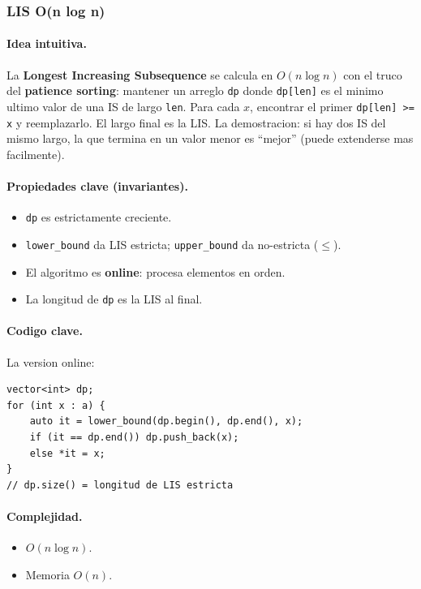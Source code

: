 ﻿\subsubsection{LIS O(n log n)}

\paragraph{Idea intuitiva.}
La \textbf{Longest Increasing Subsequence} se calcula en $O(n \log n)$ con el truco del \textbf{patience sorting}: mantener un arreglo \texttt{dp} donde \texttt{dp[len]} es el minimo ultimo valor de una IS de largo \texttt{len}. Para cada $x$, encontrar el primer \texttt{dp[len] >= x} y reemplazarlo. El largo final es la LIS. La demostracion: si hay dos IS del mismo largo, la que termina en un valor menor es ``mejor'' (puede extenderse mas facilmente).

\paragraph{Propiedades clave (invariantes).}
\begin{itemize}\setlength\itemsep{0pt}
	\item \texttt{dp} es estrictamente creciente.
	\item \texttt{lower\_bound} da LIS estricta; \texttt{upper\_bound} da no-estricta ($\le$).
	\item El algoritmo es \textbf{online}: procesa elementos en orden.
	\item La longitud de \texttt{dp} es la LIS al final.
\end{itemize}

\paragraph{Codigo clave.}
La version online:
\begin{verbatim}
vector<int> dp;
for (int x : a) {
    auto it = lower_bound(dp.begin(), dp.end(), x);
    if (it == dp.end()) dp.push_back(x);
    else *it = x;
}
// dp.size() = longitud de LIS estricta
\end{verbatim}

\paragraph{Complejidad.}
\begin{itemize}\setlength\itemsep{0pt}
	\item $O(n \log n)$.
	\item Memoria $O(n)$.
\end{itemize}

